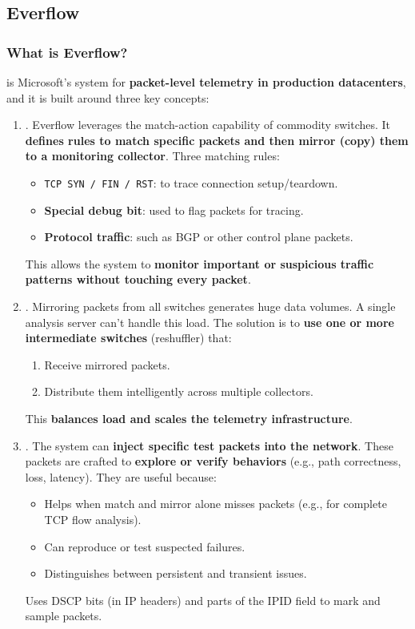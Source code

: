 \subsection{Everflow}\label{subsection: Everflow}

\subsubsection{What is Everflow?}

\cite{greenberg2015packet-level} is Microsoft's system for \textbf{packet-level telemetry in production datacenters}, and it is built around three key concepts:
\begin{enumerate}
    \item {}. Everflow leverages the match-action capability of commodity switches. It \textbf{defines rules to match specific packets and then mirror (copy) them to a monitoring collector}. Three matching rules:
    \begin{itemize}
        \item \texttt{TCP SYN / FIN / RST}: to trace connection setup/teardown.
        \item \textbf{Special debug bit}: used to flag packets for tracing.
        \item \textbf{Protocol traffic}: such as BGP or other control plane packets.
    \end{itemize}
    This allows the system to \textbf{monitor important or suspicious traffic patterns without touching every packet}.
    
    
    \item {}. Mirroring packets from all switches generates huge data volumes. A single analysis server can't handle this load. The solution is to \textbf{use one or more intermediate switches} (reshuffler) that:
    \begin{enumerate}
        \item Receive mirrored packets.
        \item Distribute them intelligently across multiple collectors.
    \end{enumerate}
    This \textbf{balances load and scales the telemetry infrastructure}.
    

    \item {}. The system can \textbf{inject specific test packets into the network}. These packets are crafted to \textbf{explore or verify behaviors} (e.g., path correctness, loss, latency). They are useful because:
    \begin{itemize}
        \item Helps when match and mirror alone misses packets (e.g., for complete TCP flow analysis).
        \item Can reproduce or test suspected failures.
        \item Distinguishes between persistent and transient issues.
    \end{itemize}
    Uses DSCP bits (in IP headers) and parts of the IPID field to mark and sample packets.
\end{enumerate}

